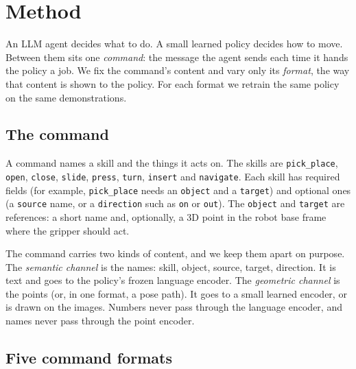 \section{Method}
\label{sec:method}



An LLM agent decides what to do. A small learned policy decides how to move.
Between them sits one \emph{command}: the message the agent sends each time it
hands the policy a job. We fix the command's content and vary only its
\emph{format}, the way that content is shown to the policy. For each format we
retrain the same policy on the same demonstrations.

\subsection{The command}
\label{sec:command}

A command names a skill and the things it acts on. The skills are
\texttt{pick\_place}, \texttt{open}, \texttt{close}, \texttt{slide},
\texttt{press}, \texttt{turn}, \texttt{insert} and \texttt{navigate}. Each
skill has required fields (for example, \texttt{pick\_place} needs an
\texttt{object} and a \texttt{target}) and optional ones (a \texttt{source}
name, or a \texttt{direction} such as \texttt{on} or \texttt{out}). The
\texttt{object} and \texttt{target} are references: a short name and,
optionally, a 3D point in the robot base frame where the gripper should act.

The command carries two kinds of content, and we keep them apart on purpose.
The \emph{semantic channel} is the names: skill, object, source, target,
direction. It is text and goes to the policy's frozen language encoder. The
\emph{geometric channel} is the points (or, in one format, a pose path). It
goes to a small learned encoder, or is drawn on the images. Numbers never pass
through the language encoder, and names never pass through the point encoder.

\subsection{Five command formats}
\label{sec:formats}

